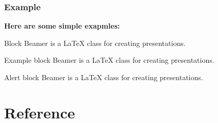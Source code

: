 \documentclass{beamer}
\begin{document}
\begin{frame}
    \frametitle{Example}
    \textbf{Here are some simple exapmles:}
    \vspace{2em}
    \begin{block}{Block}
        Beamer is a {\LaTeX} class for creating presentations.      
    \end{block}
    \begin{example}{Example block}
        Beamer is a {\LaTeX} class for creating presentations. 
    \end{example}
    \begin{alertblock}{Alert block}
        Beamer is a {\LaTeX} class for creating presentations. 
    \end{alertblock}
\end{frame}

\section*{Reference}
\begin{frame}
\end{frame}
\end{document}
